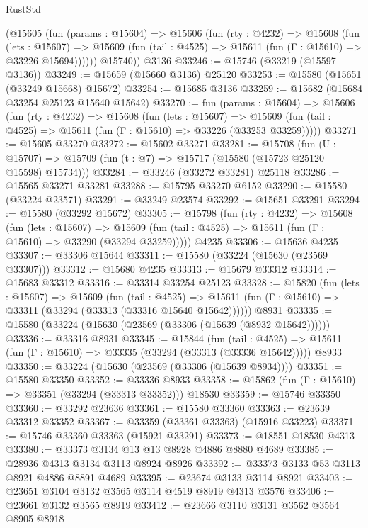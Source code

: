 \begin{lexlean}{RustStd}
\begin{coremodule}
        (@15605
          (fun (params : @15604) =>
          @15606
            (fun (rty : @4232) =>
            @15608
              (fun (lets : @15607) =>
              @15609 (fun (tail : @4525) => @15611 (fun (Γ : @15610) => @33226 @15694))))))
        @15740))
    @3136
@33246 := @15746 (@33219 (@15597 @3136))
@33249 := @15659 (@15660 @3136) @25120
@33253 := @15580 (@15651 (@33249 @15668) @15672)
@33254 := @15685 @3136
@33259 := @15682 (@15684 @33254 @25123 @15640 @15642)
@33270 := fun (params : @15604) =>
  @15606
    (fun (rty : @4232) =>
    @15608
      (fun (lets : @15607) =>
      @15609 (fun (tail : @4525) => @15611 (fun (Γ : @15610) => @33226 (@33253 @33259)))))
@33271 := @15605 @33270
@33272 := @15602 @33271
@33281 := @15708
    (fun (U : @15707) => @15709 (fun (t : @7) => @15717 (@15580 (@15723 @25120 @15598) @15734)))
@33284 := @33246 (@33272 @33281) @25118
@33286 := @15565 @33271 @33281
@33288 := @15795 @33270 @6152
@33290 := @15580 (@33224 @23571)
@33291 := @33249 @23574
@33292 := @15651 @33291
@33294 := @15580 (@33292 @15672)
@33305 := @15798
    (fun (rty : @4232) =>
    @15608
      (fun (lets : @15607) =>
      @15609 (fun (tail : @4525) => @15611 (fun (Γ : @15610) => @33290 (@33294 @33259)))))
    @4235
@33306 := @15636 @4235
@33307 := @33306 @15644
@33311 := @15580 (@33224 (@15630 (@23569 @33307)))
@33312 := @15680 @4235
@33313 := @15679 @33312
@33314 := @15683 @33312
@33316 := @33314 @33254 @25123
@33328 := @15820
    (fun (lets : @15607) =>
    @15609
      (fun (tail : @4525) =>
      @15611 (fun (Γ : @15610) => @33311 (@33294 (@33313 (@33316 @15640 @15642))))))
    @8931
@33335 := @15580 (@33224 (@15630 (@23569 (@33306 (@15639 (@8932 @15642))))))
@33336 := @33316 @8931
@33345 := @15844
    (fun (tail : @4525) => @15611 (fun (Γ : @15610) => @33335 (@33294 (@33313 (@33336 @15642)))))
    @8933
@33350 := @33224 (@15630 (@23569 (@33306 (@15639 @8934))))
@33351 := @15580 @33350
@33352 := @33336 @8933
@33358 := @15862 (fun (Γ : @15610) => @33351 (@33294 (@33313 @33352))) @18530
@33359 := @15746 @33350
@33360 := @33292 @23636
@33361 := @15580 @33360
@33363 := @23639 @33312 @33352
@33367 := @33359 (@33361 @33363) (@15916 @33223)
@33371 := @15746 @33360 @33363 (@15921 @33291)
@33373 := @18551 @18530 @4313
@33380 := @33373 @3134 @13 @13 @8928 @4886 @8880 @4689
@33385 := @28936 @4313 @3134 @3113 @8924 @8926
@33392 := @33373 @3133 @53 @3113 @8921 @4886 @8891 @4689
@33395 := @23674 @3133 @3114 @8921
@33403 := @23651 @3104 @3132 @3565 @3114 @4519 @8919 @4313 @3576
@33406 := @23661 @3132 @3565 @8919
@33412 := @23666 @3110 @3131 @3562 @3564 @8905 @8918

\end{coremodule}
\end{lexlean}
